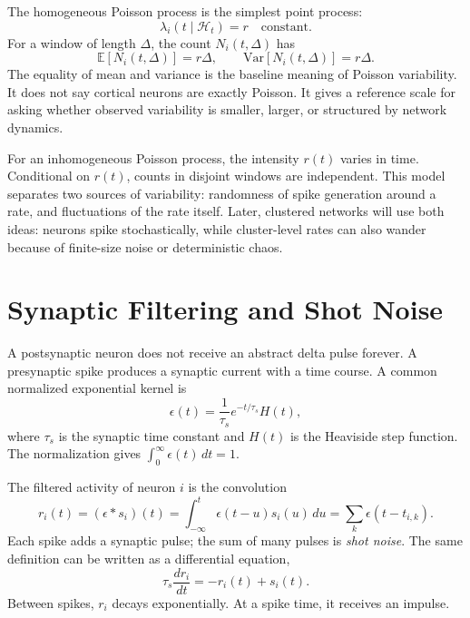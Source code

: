 The homogeneous Poisson process is the simplest point process:
%
\begin{equation}
  \lambda_i(t\mid\mathcal{H}_t)=r
  \quad \text{constant}.
  \label{eq:poisson-intensity}
\end{equation}
%
For a window of length $\Delta$, the count $N_i(t,\Delta)$ has
%
\begin{equation}
  \mathbb{E}[N_i(t,\Delta)] = r\Delta,
  \qquad
  \mathrm{Var}[N_i(t,\Delta)] = r\Delta.
  \label{eq:poisson-count-moments}
\end{equation}
%
The equality of mean and variance is the baseline meaning of Poisson variability. It does not say cortical neurons are exactly Poisson. It gives a reference scale for asking whether observed variability is smaller, larger, or structured by network dynamics.

For an inhomogeneous Poisson process, the intensity $r(t)$ varies in time. Conditional on $r(t)$, counts in disjoint windows are independent. This model separates two sources of variability: randomness of spike generation around a rate, and fluctuations of the rate itself. Later, clustered networks will use both ideas: neurons spike stochastically, while cluster-level rates can also wander because of finite-size noise or deterministic chaos.

\section{Synaptic Filtering and Shot Noise}
\label{sec:synaptic-filtering-shot-noise}

A postsynaptic neuron does not receive an abstract delta pulse forever. A presynaptic spike produces a synaptic current with a time course. A common normalized exponential kernel is
%
\begin{equation}
  \epsilon(t)
  =
  \frac{1}{\tau_s}e^{-t/\tau_s}H(t),
  \label{eq:exponential-synaptic-kernel}
\end{equation}
%
where $\tau_s$ is the synaptic time constant and $H(t)$ is the Heaviside step function. The normalization gives $\int_0^\infty \epsilon(t)\,dt=1$.

The filtered activity of neuron $i$ is the convolution
%
\begin{equation}
  r_i(t)
  =
  (\epsilon*s_i)(t)
  =
  \int_{-\infty}^{t} \epsilon(t-u)s_i(u)\,du
  =
  \sum_k \epsilon(t-t_{i,k}).
  \label{eq:filtered-spike-train}
\end{equation}
%
Each spike adds a synaptic pulse; the sum of many pulses is \emph{shot noise}. The same definition can be written as a differential equation,
%
\begin{equation}
  \tau_s \frac{d r_i}{dt} = -r_i(t) + s_i(t).
  \label{eq:filtered-spike-ode}
\end{equation}
%
Between spikes, $r_i$ decays exponentially. At a spike time, it receives an impulse.

